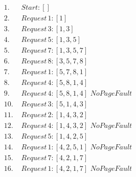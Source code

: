 \begin{align*}
1.\,\, &Start: [] \\
2.\,\, &Request\, 1: [1] \\
3.\,\, &Request\, 3: [1, 3] \\
4.\,\, &Request\, 5: [1, 3, 5] \\
5.\,\, &Request\, 7: [1, 3, 5, 7] \\
6.\,\, &Request\, 8: [3, 5, 7, 8] \\
7.\,\, &Request\, 1: [5, 7, 8, 1] \\
8.\,\, &Request\, 4: [5, 8, 1, 4] \\
9.\,\, &Request\, 4: [5, 8, 1, 4] \,\, No Page Fault \\
10.\,\, &Request\, 3: [5, 1, 4, 3] \\
11.\,\, &Request\, 2: [1, 4, 3, 2] \\
12.\,\, &Request\, 4: [1, 4, 3, 2] \,\, No Page Fault \\
13.\,\, &Request\, 5: [1, 4, 2, 5] \\
14.\,\, &Request\, 1: [4, 2, 5, 1] \,\, No Page Fault \\
15.\,\, &Request\, 7: [4, 2, 1, 7] \\
16.\,\, &Request\, 1: [4, 2, 1, 7] \,\, No Page Fault
\end{align*}
